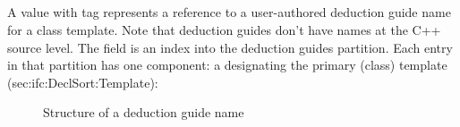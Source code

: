 
\subsection{}
\label{sec:ifc:NameSort:Guide}

A  value with tag  represents a reference to a 
user-authored deduction guide name for a class template.
Note that deduction guides don't have names at the C++ source level.  
The  field is an index into the deduction guides partition.  
Each entry in that partition has one component: a  designating the 
primary (class) template ({sec:ifc:DeclSort:Template}):
%
\begin{figure}[H]
	\centering
	\caption{Structure of a deduction guide name}
	\label{fig:ifc-guide-name-structure}
\end{figure} 



